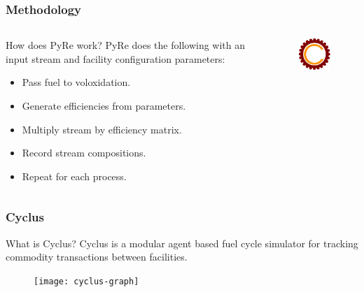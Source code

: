 \begin{frame}
  \frametitle{Methodology}
\begin{columns}
	\begin{column}{.55\textwidth}
		\begin{block}{How does PyRe work?} 
			PyRe does the following with an input stream and facility configuration parameters: 
			\begin{itemize}
				\item Pass fuel to voloxidation.
				\item Generate efficiencies from parameters.
				\item Multiply stream by efficiency matrix.
				\item Record stream compositions.
				\item Repeat for each process.
			\end{itemize}
		\end{block}
	\end{column}
	\begin{column}{.45\textwidth}
		\begin{figure}
			\centering
			\includegraphics[width=0.9\linewidth]{cyclus}
			\label{fig:cyclus}
		\end{figure}
	\end{column}
\end{columns} 
\end{frame}

\begin{frame}
	\frametitle{Cyclus}
    \begin{block}{What is Cyclus?}
    	Cyclus is a modular agent based fuel cycle simulator for tracking commodity transactions
    	between facilities.
    \end{block}
	\begin{figure}
		\centering
		\texttt{[image: cyclus-graph]}
	\end{figure}
\end{frame}

